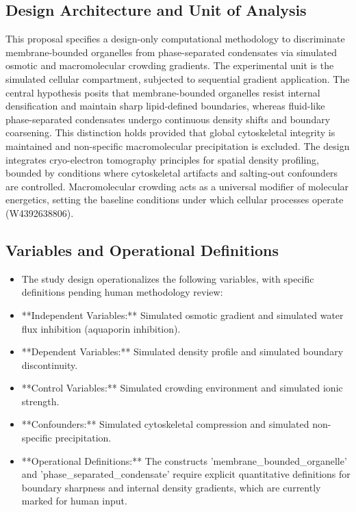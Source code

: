 \documentclass[conference]{IEEEtran}
\begin{document}
\subsection{Design Architecture and Unit of Analysis}
This proposal specifies a design-only computational methodology to discriminate membrane-bounded organelles from phase-separated condensates via simulated osmotic and macromolecular crowding gradients. The experimental unit is the simulated cellular compartment, subjected to sequential gradient application. The central hypothesis posits that membrane-bounded organelles resist internal densification and maintain sharp lipid-defined boundaries, whereas fluid-like phase-separated condensates undergo continuous density shifts and boundary coarsening. This distinction holds provided that global cytoskeletal integrity is maintained and non-specific macromolecular precipitation is excluded. The design integrates cryo-electron tomography principles for spatial density profiling, bounded by conditions where cytoskeletal artifacts and salting-out confounders are controlled. Macromolecular crowding acts as a universal modifier of molecular energetics, setting the baseline conditions under which cellular processes operate (W4392638806).~\cite{cite_42ed299a53990c06}

\subsection{Variables and Operational Definitions}
\begin{itemize}
\item The study design operationalizes the following variables, with specific definitions pending human methodology review:
\item **Independent Variables:** Simulated osmotic gradient and simulated water flux inhibition (aquaporin inhibition).
\item **Dependent Variables:** Simulated density profile and simulated boundary discontinuity.
\item **Control Variables:** Simulated crowding environment and simulated ionic strength.
\item **Confounders:** Simulated cytoskeletal compression and simulated non-specific precipitation.
\item **Operational Definitions:** The constructs 'membrane\_bounded\_organelle' and 'phase\_separated\_condensate' require explicit quantitative definitions for boundary sharpness and internal density gradients, which are currently marked for human input.
\end{itemize}
\end{document}
